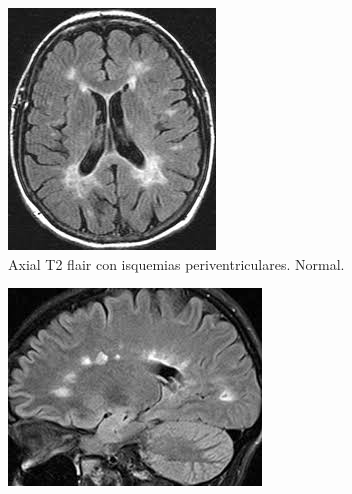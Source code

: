 \begin{figure}[H]
    \centering
    \begin{subfigure}[b]{0.3\textwidth}
        \centering
        \includegraphics[width=\linewidth]{chapters/deteccion/images/sano1.jpg}
        \caption{Axial T2 flair con isquemias periventriculares. Normal.}
        \label{fig:normal1}
    \end{subfigure}
    \hfill
    \begin{subfigure}[b]{0.3\textwidth}
        \centering
        \includegraphics[width=\linewidth]{chapters/deteccion/images/sano2.jpg}

\end{subfigure}
\end{figure}
